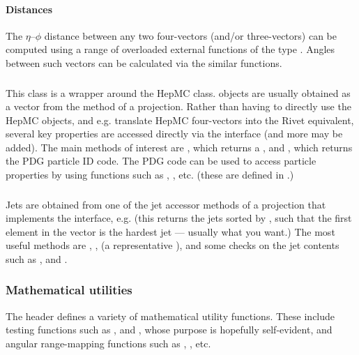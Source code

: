 \paragraph{Distances}%
The $\eta$--$\phi$ distance between any two four-vectors (and/or three-vectors)
can be computed using a range of overloaded external functions of the type
. Angles between such vectors can be calculated via the
similar  functions.

\subsubsection{}
This class is a wrapper around the HepMC 
class.  objects are usually obtained as a vector from the
 method of a  projection.  Rather than having
to directly use the HepMC objects, and e.g. translate HepMC four-vectors into
the Rivet equivalent, several key properties are accessed directly via the
 interface (and more may be added). The main methods of interest
are , which returns a , and ,
which returns the PDG particle ID code. The PDG code can be used to access
particle properties by using functions such as ,
, etc. (these are defined in
.)

\subsubsection{}
Jets are obtained from one of the jet accessor methods of a projection that
implements the  interface, e.g.  (this
returns the jets sorted by \pT, such that the first element in the vector is the
hardest jet --- usually what you want.) The most useful methods are
, ,  (a representative
), and some checks on the jet contents such as
,  and
.


\subsubsection{Mathematical utilities}
The  header defines a variety of mathematical
utility functions. These include testing functions such as ,
 and , whose purpose is
hopefully self-evident, and angular range-mapping functions such as
, , etc.



